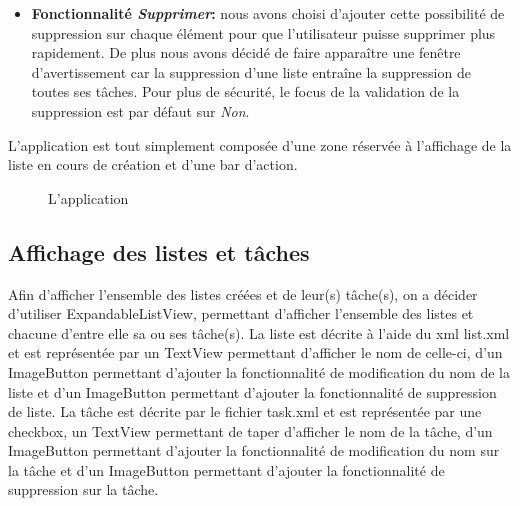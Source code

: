 \documentclass[a4paper,10pt]{article}
\begin{document}
\begin{itemize}
\item \textbf{Fonctionnalité \textit{Supprimer}:} nous avons choisi d'ajouter cette possibilité de suppression sur chaque élément pour que l'utilisateur puisse supprimer plus rapidement. De  plus nous avons décidé de faire apparaître une fenêtre d'avertissement car la suppression d'une liste entraîne la suppression de toutes ses tâches. 
Pour plus de sécurité, le focus de la validation de la suppression est par défaut sur \textit{Non}. %
\end{itemize}

L'application est tout simplement composée d'une zone réservée à l'affichage de la liste en cours de création et d'une bar d'action.
\begin{figure}[H]
    \caption{L'application}
\end{figure}



\subsection{Affichage des listes et tâches}
Afin d'afficher l'ensemble des listes créées et de leur(s) tâche(s), on a décider d'utiliser ExpandableListView, permettant d'afficher l'ensemble des listes et chacune d'entre elle sa ou ses tâche(s).
La liste est décrite à l'aide du xml list.xml et est représentée par un TextView permettant d'afficher le nom de celle-ci, d'un ImageButton permettant d'ajouter la fonctionnalité de modification du nom de la liste et d'un ImageButton permettant d'ajouter la fonctionnalité de suppression de liste.
La tâche est décrite par le fichier task.xml et est représentée par une checkbox, un TextView permettant de taper d'afficher le nom de la tâche, d'un ImageButton permettant d'ajouter la fonctionnalité de modification du nom sur la tâche et d'un ImageButton permettant d'ajouter la fonctionnalité de suppression sur la tâche.
\end{document}

